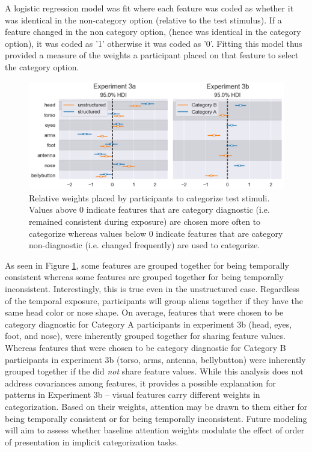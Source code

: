 A logistic regression model was fit where each feature was coded as whether it was identical in the non-category option (relative to the test stimulus). If a feature changed in the non category option, (hence was identical in the category option), it was coded as '1' otherwise it was coded as '0'. Fitting this model thus provided a measure of the weights a participant placed on that feature to select the category option. 

\begin{figure}[H]
    \centering
    \includegraphics[width = \textwidth]{chapter_notebooks/chapter_4/figures/feat_importances.png}
    \caption{Relative weights placed by participants to categorize test stimuli. Values above 0 indicate features that are category diagnostic (i.e. remained consistent during exposure) are chosen more often to categorize whereas values below 0 indicate features that are category non-diagnostic (i.e. changed frequently) are used to categorize.}
    \label{fig:feat-importances}
\end{figure}

As seen in Figure \ref{fig:feat-importances}, some features are grouped together for being temporally consistent whereas some features are grouped together for being temporally inconsistent. Interestingly, this is true even in the unstructured case. Regardless of the temporal exposure, participants will group aliens together if they have the same head color or nose shape. On average, features that were chosen to be category diagnostic for Category A participants in experiment 3b (head, eyes, foot, and nose), were inherently grouped together for sharing feature values. Whereas features that were chosen to be category diagnostic for Category B participants in experiment 3b (torso, arms, antenna, bellybutton) were inherently grouped together if the did \textit{not} share feature values. While this analysis does not address covariances among features, it provides a possible explanation for patterns in Experiment 3b -- visual features carry different weights in categorization. Based on their weights, attention may be drawn to them either for being temporally consistent or for being temporally inconsistent. Future modeling will aim to assess whether baseline attention weights modulate the effect of order of presentation in implicit categorization tasks. 